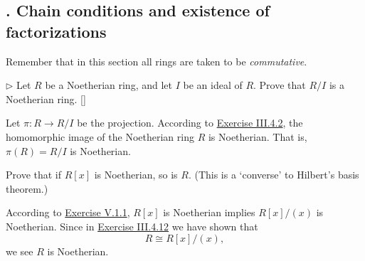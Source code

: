 \documentclass[12pt,letterpaper,boxed]{hmcpset}
\begin{document}
\subsection{. Chain conditions and existence of factorizations}
Remember that in this section all rings are taken to be \emph{commutative}.

\hypertarget{Exercise V.1.1}{}
\begin{problem}[1.1]
	$\triangleright$ Let $R$ be a Noetherian ring, and let $I$ be an ideal of $R$. Prove that $R / I$ is a Noetherian ring. []
\end{problem}
\begin{solution}
	Let $\pi:R\to R / I$ be the projection. According to \hyperlink{Exercise III.4.2}{Exercise III.4.2}, the homomorphic image of the Noetherian ring $R$ is Noetherian. That is, $\pi(R)=R / I$ is Noetherian.
\end{solution}

\begin{problem}[1.2]
Prove that if $R[x]$ is Noetherian, so is $R$. (This is a `converse' to Hilbert's basis theorem.)
\end{problem}
\begin{solution}
According to \hyperlink{Exercise V.1.1}{Exercise V.1.1}, $R[x]$ is Noetherian implies $R\left[x\right]/\left(x\right)$ is Noetherian. Since in \hyperlink{Exercise III.4.12}{Exercise III.4.12} we have shown that
\[
R\cong R\left[x\right]/\left(x\right),
\]
we see $R$ is Noetherian.
\end{solution}


\newpage


\end{document}
